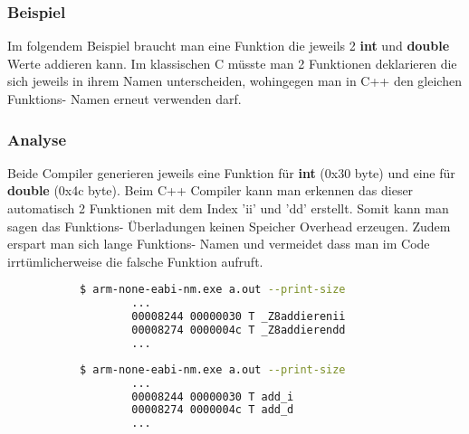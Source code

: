 \documentclass[MES,Master,ngerman]{twbook}%
\begin{document}
\subsubsection{Beispiel} \label{beispiel:1}
Im folgendem Beispiel braucht man eine Funktion die jeweils 2 \textbf{int} und \textbf{double} Werte addieren kann. Im klassischen C müsste man 2 Funktionen deklarieren die sich jeweils in ihrem Namen unterscheiden, wohingegen man in C++ den gleichen Funktions- Namen erneut verwenden darf.
\begin{figure}[!htb]
	\begin{subfigure}[b]{0.5\textwidth}
		
		\label{fig:1}
	\end{subfigure}
	\begin{subfigure}[b]{0.5\textwidth}
		
		\label{fig:2}
	\end{subfigure}
\end{figure}

\subsubsection{Analyse}
Beide Compiler generieren jeweils eine Funktion für \textbf{int} (0x30 byte) und eine für \textbf{double} (0x4c byte). Beim C++ Compiler kann man erkennen das dieser automatisch 2 Funktionen mit dem Index 'ii' und 'dd' erstellt. Somit kann man sagen das Funktions- Überladungen keinen Speicher Overhead erzeugen. Zudem erspart man sich lange Funktions- Namen und vermeidet dass man im Code irrtümlicherweise die falsche Funktion aufruft.
\begin{figure}[!htb]
	\begin{subfigure}[b]{0.5\textwidth}
		\begin{lstlisting}[gobble=6, title={Compiler Output C++}, language=bash, numbers=none]
		$ arm-none-eabi-nm.exe a.out --print-size
		...
		00008244 00000030 T _Z8addierenii
		00008274 0000004c T _Z8addierendd
		...
		\end{lstlisting}
	\end{subfigure}
	\begin{subfigure}[b]{0.5\textwidth}
		\begin{lstlisting}[gobble=6, title={Compiler Output C}, language=bash, numbers=none]
		$ arm-none-eabi-nm.exe a.out --print-size
		...
		00008244 00000030 T add_i
		00008274 0000004c T add_d
		...
		\end{lstlisting}
	\end{subfigure}
\end{figure}
\end{document}
